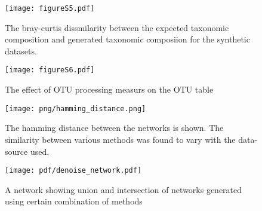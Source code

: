 \begin{figure}[h]
  \centering
  \texttt{[image: figureS5.pdf]}
  \caption{
    The bray-curtis dissmilarity between the expected taxonomic composition and generated taxonomic composiion for the synthetic datasets.
}
  \label{fig:figureS4}
\end{figure}

\begin{figure}[h]
  \centering
  \texttt{[image: figureS6.pdf]}
  \caption{
    The effect of OTU processing measurs on the OTU table
}
  \label{fig:figureS4}
\end{figure}

\begin{figure}[h]
  \centering
  \texttt{[image: png/hamming\_distance.png]}
  \caption{The hamming distance between the networks is shown. The similarity between various methods was found to vary with the data-source used.}
  \label{fig:figureS4}
\end{figure}

\begin{figure}[h]
  \centering
  \texttt{[image: pdf/denoise\_network.pdf]}
  \caption{A network showing union and intersection of networks generated using certain combination of methods}
  \label{fig:figureS5}
\end{figure}



